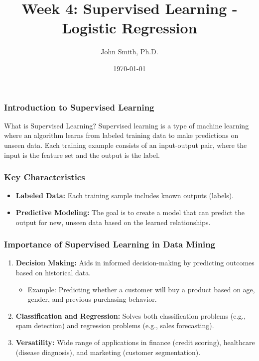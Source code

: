 \documentclass[aspectratio=169]{beamer}
\title[Week 4: Supervised Learning]{Week 4: Supervised Learning - Logistic Regression}
\author[J. Smith]{John Smith, Ph.D.}
\institute[University Name]{
  Department of Computer Science\\
  University Name\\
  \vspace{0.3cm}
  Email: email@university.edu\\
  Website: www.university.edu
}
\date{\today}
\begin{document}
\frame{\titlepage}

\begin{frame}[fragile]
    \frametitle{Introduction to Supervised Learning}
    \begin{block}{What is Supervised Learning?}
        Supervised learning is a type of machine learning where an algorithm learns from labeled training data to make predictions on unseen data. Each training example consists of an input-output pair, where the input is the feature set and the output is the label.
    \end{block}
\end{frame}

\begin{frame}[fragile]
    \frametitle{Key Characteristics}
    \begin{itemize}
        \item \textbf{Labeled Data:} Each training sample includes known outputs (labels).
        \item \textbf{Predictive Modeling:} The goal is to create a model that can predict the output for new, unseen data based on the learned relationships.
    \end{itemize}
\end{frame}

\begin{frame}[fragile]
    \frametitle{Importance of Supervised Learning in Data Mining}
    \begin{enumerate}
        \item \textbf{Decision Making:} Aids in informed decision-making by predicting outcomes based on historical data.
        \begin{itemize}
            \item Example: Predicting whether a customer will buy a product based on age, gender, and previous purchasing behavior.
        \end{itemize}
        \item \textbf{Classification and Regression:} Solves both classification problems (e.g., spam detection) and regression problems (e.g., sales forecasting).
        \item \textbf{Versatility:} Wide range of applications in finance (credit scoring), healthcare (disease diagnosis), and marketing (customer segmentation).
    \end{enumerate}
\end{frame}
\end{document}
